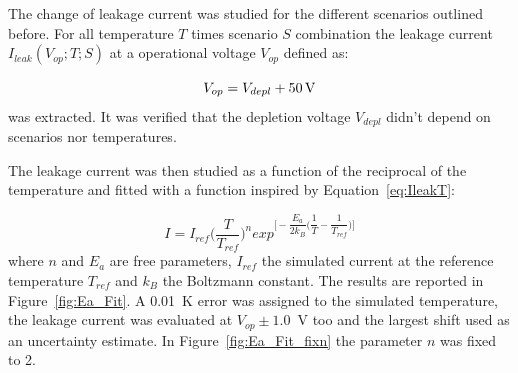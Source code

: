 The change of leakage current was studied for the different scenarios outlined before. 
For all temperature $T$ times scenario $S$ combination the leakage current $I_{leak}(V_{op};T;S)$ 
at a 
operational voltage 
$V_{op}$ defined as:

\begin{equation}
V_{op}=V_{depl}+50\,{\rm V}
\label{eq:Vop}
\end{equation} 
was extracted. It was verified that the depletion voltage $V_{depl}$ didn't depend on scenarios nor temperatures.

 The leakage current was then studied as a function of the reciprocal of the 
temperature and fitted with a function inspired by Equation~\ref{eq:IleakT}:

\begin{equation}
I = I_{ref}\Bigg(\dfrac{T}{T_{ref}}\Bigg)^n exp^{\Bigg[ -\dfrac{E_{a}}{2k_B}\Bigg( \dfrac{1}{T}- \dfrac{1}{T_{ref}} \Bigg) \Bigg]}
\label{eq:ITfunc}
\end{equation}
where $n$ and $E_{a}$ are free parameters, $I_{ref}$ the simulated current at the reference 
temperature $T_{ref}$ and $k_B$ the Boltzmann constant.
The results are reported in Figure~\ref{fig:Ea_Fit}. A 0.01~K error was assigned to the 
simulated temperature, the leakage current was evaluated at $V_{op}\pm1.0$~V too and the largest 
shift used as an uncertainty estimate.
In Figure~\ref{fig:Ea_Fit_fixn} the  parameter $n$ was fixed to 2.

